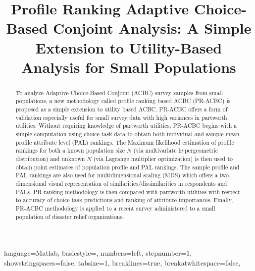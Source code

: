 \documentclass[a4paper, 12pt]{article}
\title {Profile Ranking Adaptive Choice-Based Conjoint Analysis: A Simple Extension to Utility-Based Analysis for Small Populations}
\author[1]{}
\date{}
\begin{document}
\lstset
{ %
    language=Matlab,
    basicstyle=\scriptsize,
    numbers=left,
    stepnumber=1,
    showstringspaces=false,
    tabsize=1,
    breaklines=true,
    breakatwhitespace=false,
}
\maketitle
\hrulefill



 \vspace{.7in}

 \begin{abstract}
To analyze Adaptive Choice-Based Conjoint (ACBC) survey samples from small populations, a new methodology called profile ranking based ACBC (PR-ACBC) is proposed as a simple extension to utility based  ACBC. PR-ACBC offers a form of validation especially useful for small survey data with high variances in partworth utilities. Without requiring knowledge of partworth utilities, PR-ACBC begins with a simple computation using choice task data to obtain both individual and sample mean profile attribute level (PAL) rankings. The Maximum likelihood estimation of profile rankings for both a known population size $N$ (via multivariate hypergeometric distribution) and unknown $N$ (via Lagrange multiplier optimization) is then used to obtain point estimates of population profile and PAL rankings.  The sample profile and PAL rankings are also used  for  multidimensional scaling (MDS) which offers a two-dimensional visual representation of similarities/dissimilarities in respondents and PALs.  PR-ranking methodology is then compared with partworth utilities with respect to accuracy of choice task predictions and ranking of attribute importances. Finally, PR-ACBC methodology is applied to a recent survey administered to  a small population of disaster relief organizations.

\end{abstract}


\end{document}
